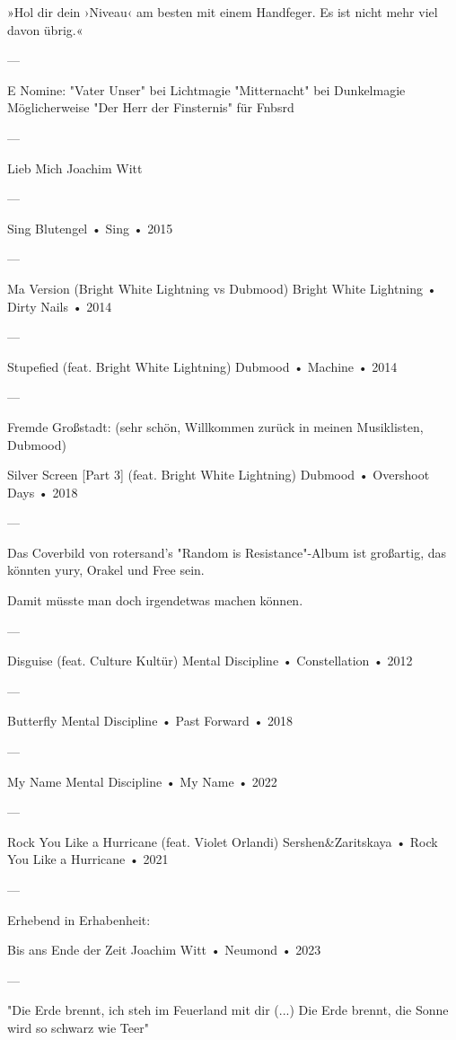 »Hol dir dein ›Niveau‹ am besten mit einem Handfeger. Es ist nicht mehr viel davon übrig.«

—

E Nomine:
"Vater Unser" bei Lichtmagie
"Mitternacht" bei Dunkelmagie
Möglicherweise "Der Herr der Finsternis" für Fnbsrd

—

Lieb Mich
Joachim Witt

—

Sing
Blutengel
 •
Sing
 •
2015



—

Ma Version (Bright White Lightning vs Dubmood)
Bright White Lightning
 •
Dirty Nails
 •
2014


—

Stupefied (feat. Bright White Lightning)
Dubmood
 •
Machine
 •
2014


—

Fremde Großstadt: (sehr schön, Willkommen zurück in meinen Musiklisten, Dubmood)

Silver Screen [Part 3] (feat. Bright White Lightning)
Dubmood
 •
Overshoot Days
 •
2018

—

Das Coverbild von rotersand's "Random is Resistance"-Album ist großartig, das könnten yury, Orakel und Free sein.

Damit müsste man doch irgendetwas machen können.

—

Disguise (feat. Culture Kultür)
Mental Discipline
 •
Constellation
 •
2012



—

Butterfly
Mental Discipline
 •
Past Forward
 •
2018


—

My Name
Mental Discipline
 •
My Name
 •
2022


—

Rock You Like a Hurricane (feat. Violet Orlandi)
Sershen&Zaritskaya
 •
Rock You Like a Hurricane
 •
2021


—

Erhebend in Erhabenheit:

Bis ans Ende der Zeit
Joachim Witt
 •
Neumond
 •
2023




—

"Die Erde brennt, ich steh im Feuerland mit dir
(...)
Die Erde brennt, die Sonne wird so schwarz wie Teer"

